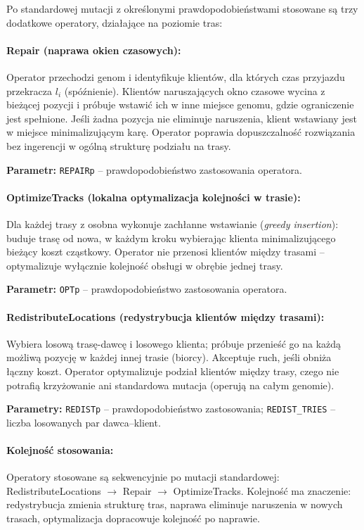 \documentclass[11pt,a4paper]{article}
\begin{document}
Po standardowej mutacji z określonymi prawdopodobieństwami stosowane są trzy
dodatkowe operatory, działające na poziomie tras:

\paragraph{Repair (naprawa okien czasowych):}
Operator przechodzi genom i identyfikuje klientów, dla których czas przyjazdu
przekracza $l_i$ (spóźnienie). Klientów naruszających okno czasowe wycina
z bieżącej pozycji i próbuje wstawić ich w inne miejsce genomu, gdzie ograniczenie
jest spełnione. Jeśli żadna pozycja nie eliminuje naruszenia, klient wstawiany jest
w miejsce minimalizującym karę. Operator poprawia dopuszczalność rozwiązania
bez ingerencji w ogólną strukturę podziału na trasy.

\textbf{Parametr:} \texttt{REPAIRp} -- prawdopodobieństwo zastosowania operatora.

\paragraph{OptimizeTracks (lokalna optymalizacja kolejności w trasie):}
Dla każdej trasy z osobna wykonuje zachłanne wstawianie (\textit{greedy insertion}):
buduje trasę od nowa, w każdym kroku wybierając klienta minimalizującego
bieżący koszt cząstkowy. Operator nie przenosi klientów między trasami -- optymalizuje
wyłącznie kolejność obsługi w obrębie jednej trasy.

\textbf{Parametr:} \texttt{OPTp} -- prawdopodobieństwo zastosowania operatora.

\paragraph{RedistributeLocations (redystrybucja klientów między trasami):}
Wybiera losową trasę-dawcę i losowego klienta; próbuje przenieść go na każdą
możliwą pozycję w każdej innej trasie (biorcy). Akceptuje ruch, jeśli obniża
łączny koszt. Operator optymalizuje podział klientów między trasy, czego nie
potrafią krzyżowanie ani standardowa mutacja (operują na całym genomie).

\textbf{Parametry:} \texttt{REDISTp} -- prawdopodobieństwo zastosowania;
\texttt{REDIST\_TRIES} -- liczba losowanych par dawca--klient.

\paragraph{Kolejność stosowania:}
Operatory stosowane są sekwencyjnie po mutacji standardowej:
RedistributeLocations $\to$ Repair $\to$ OptimizeTracks.
Kolejność ma znaczenie: redystrybucja zmienia strukturę tras, naprawa eliminuje
naruszenia w nowych trasach, optymalizacja dopracowuje kolejność po naprawie.
\end{document}
